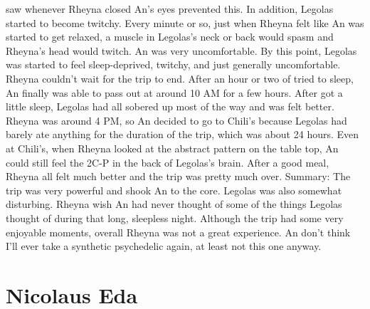 \documentclass[12pt]{book}
\begin{document}
saw whenever Rheyna closed An's eyes prevented this. In addition, Legolas started to become twitchy. Every minute or so, just when Rheyna felt like An was started to get relaxed, a muscle in Legolas's neck or back would spasm and Rheyna's head would twitch. An was very uncomfortable. By this point, Legolas was started to feel sleep-deprived, twitchy, and just generally uncomfortable. Rheyna couldn't wait for the trip to end. After an hour or two of tried to sleep, An finally was able to pass out at around 10 AM for a few hours. After got a little sleep, Legolas had all sobered up most of the way and was felt better. Rheyna was around 4 PM, so An decided to go to Chili's because Legolas had barely ate anything for the duration of the trip, which was about 24 hours. Even at Chili's, when Rheyna looked at the abstract pattern on the table top, An could still feel the 2C-P in the back of Legolas's brain. After a good meal, Rheyna all felt much better and the trip was pretty much over. Summary: The trip was very powerful and shook An to the core. Legolas was also somewhat disturbing. Rheyna wish An had never thought of some of the things Legolas thought of during that long, sleepless night. Although the trip had some very enjoyable moments, overall Rheyna was not a great experience. An don't think I'll ever take a synthetic psychedelic again, at least not this one anyway.






\chapter{Nicolaus Eda}
\end{document}

